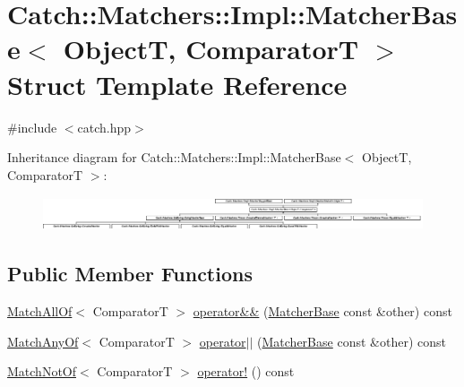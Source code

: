 \hypertarget{structCatch_1_1Matchers_1_1Impl_1_1MatcherBase}{}\section{Catch\+:\+:Matchers\+:\+:Impl\+:\+:Matcher\+Base$<$ ObjectT, ComparatorT $>$ Struct Template Reference}
\label{structCatch_1_1Matchers_1_1Impl_1_1MatcherBase}


{\ttfamily \#include $<$catch.\+hpp$>$}

Inheritance diagram for Catch\+:\+:Matchers\+:\+:Impl\+:\+:Matcher\+Base$<$ ObjectT, ComparatorT $>$\+:\begin{figure}[H]
\begin{center}
\leavevmode
\includegraphics[height=1.006289cm]{structCatch_1_1Matchers_1_1Impl_1_1MatcherBase}
\end{center}
\end{figure}
\subsection*{Public Member Functions}
\begin{DoxyCompactItemize}
\item 
\mbox{\hyperlink{structCatch_1_1Matchers_1_1Impl_1_1MatchAllOf}{Match\+All\+Of}}$<$ ComparatorT $>$ \mbox{\hyperlink{structCatch_1_1Matchers_1_1Impl_1_1MatcherBase_a3deede6b29d20c15cb5efc79df40a520}{operator\&\&}} (\mbox{\hyperlink{structCatch_1_1Matchers_1_1Impl_1_1MatcherBase}{Matcher\+Base}} const \&other) const
\item 
\mbox{\hyperlink{structCatch_1_1Matchers_1_1Impl_1_1MatchAnyOf}{Match\+Any\+Of}}$<$ ComparatorT $>$ \mbox{\hyperlink{structCatch_1_1Matchers_1_1Impl_1_1MatcherBase_ae0345ee76d109ac6d0241be261450ebc}{operator$\vert$$\vert$}} (\mbox{\hyperlink{structCatch_1_1Matchers_1_1Impl_1_1MatcherBase}{Matcher\+Base}} const \&other) const
\item 
\mbox{\hyperlink{structCatch_1_1Matchers_1_1Impl_1_1MatchNotOf}{Match\+Not\+Of}}$<$ ComparatorT $>$ \mbox{\hyperlink{structCatch_1_1Matchers_1_1Impl_1_1MatcherBase_a85174b5b27113f7bdc47c140c1c72602}{operator!}} () const
\end{DoxyCompactItemize}
